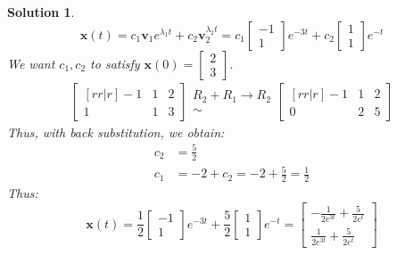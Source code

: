 \documentclass[11pt]{scrartcl}
\theoremstyle{dotlessP}
\newtheorem{sol}{Solution}[section]
\theoremstyle{dotlessN}
\begin{document}
\begin{sol}
	\[
		\bm{x}(t) = c_1\bm{v}_1e^{\lambda_1t}+c_2\bm{v}_2^{\lambda_2 t} = c_1
		\begin{bmatrix}
			-1 \\
			1
		\end{bmatrix}e^{-3t} + 
		c_2
		\begin{bmatrix}
			1 \\
			1
		\end{bmatrix}e^{-t}
	\] 
	We want $c_1, c_2$ to satisfy $\bm{x}(0) = 
\begin{bmatrix}
	2 \\
	3
\end{bmatrix}
	$. 
	\begin{align*}
		\begin{bmatrix}[rr|r]
			-1 & 1  & 2 \\
			1 & 1 & 3
		\end{bmatrix}
		\begin{array}{c}
			R_2 + R_1 \to R_2 \\
			\sim
		\end{array}
		\begin{bmatrix}[rr|r]
			-1 & 1  & 2 \\
			0 & 2 & 5
		\end{bmatrix}
	\end{align*}
	Thus, with back substitution, we obtain:
	\begin{align*}
		c_2 &= \frac{5}{2} \\
		c_1 &= -2 + c_2 = -2 + \frac{5}{2} = \frac{1}{2}
	\end{align*}
	Thus:
	\[
		\bm{x}(t) = \frac{1}{2}
		\begin{bmatrix}
			-1 \\
			1
		\end{bmatrix}e^{-3t} + 
		\frac{5}{2}
		\begin{bmatrix}
			1 \\
			1
		\end{bmatrix}e^{-t} =
		\begin{bmatrix}
			-\frac{1}{2e^{3t}} + \frac{5}{2e^t} \\
			\frac{1}{2e^{3t}} + \frac{5}{2e^t}
		\end{bmatrix}
	\] 
\end{sol}
\end{document}
